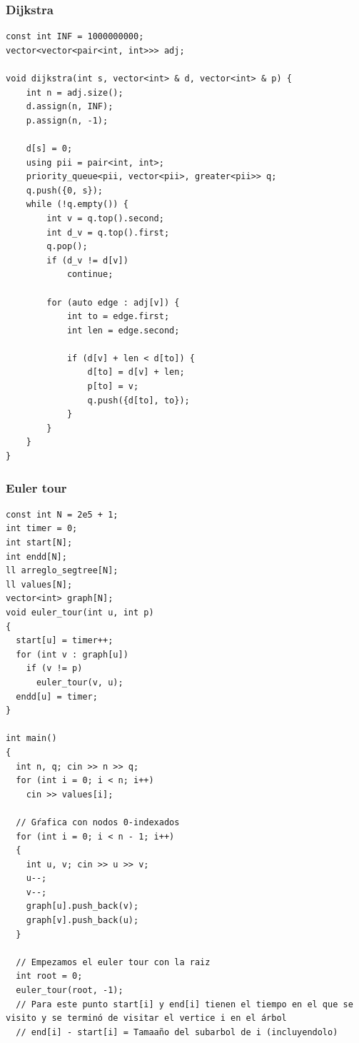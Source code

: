 \documentclass[twoside]{article}
\begin{document}
\begin{multicols*}{2}
	{
		\subsubsection*{Dijkstra}
	}
	\begin{verbatim}
const int INF = 1000000000;
vector<vector<pair<int, int>>> adj;

void dijkstra(int s, vector<int> & d, vector<int> & p) {
    int n = adj.size();
    d.assign(n, INF);
    p.assign(n, -1);

    d[s] = 0;
    using pii = pair<int, int>;
    priority_queue<pii, vector<pii>, greater<pii>> q;
    q.push({0, s});
    while (!q.empty()) {
        int v = q.top().second;
        int d_v = q.top().first;
        q.pop();
        if (d_v != d[v])
            continue;

        for (auto edge : adj[v]) {
            int to = edge.first;
            int len = edge.second;

            if (d[v] + len < d[to]) {
                d[to] = d[v] + len;
                p[to] = v;
                q.push({d[to], to});
            }
        }
    }
}
\end{verbatim}

	{
		\subsubsection*{Euler tour}
	}
	\begin{verbatim}
const int N = 2e5 + 1;
int timer = 0;
int start[N];
int endd[N];
ll arreglo_segtree[N];
ll values[N];
vector<int> graph[N];
void euler_tour(int u, int p)
{
  start[u] = timer++;
  for (int v : graph[u])
    if (v != p)
      euler_tour(v, u);
  endd[u] = timer;
}

int main()
{
  int n, q; cin >> n >> q;
  for (int i = 0; i < n; i++)
    cin >> values[i];
  
  // Gŕafica con nodos 0-indexados
  for (int i = 0; i < n - 1; i++)
  {
    int u, v; cin >> u >> v;
    u--;
    v--;
    graph[u].push_back(v);
    graph[v].push_back(u);
  }

  // Empezamos el euler tour con la raiz
  int root = 0;
  euler_tour(root, -1);
  // Para este punto start[i] y end[i] tienen el tiempo en el que se visito y se terminó de visitar el vertice i en el árbol 
  // end[i] - start[i] = Tamaaño del subarbol de i (incluyendolo)


\end{verbatim}
\end{multicols*}
\end{document}
